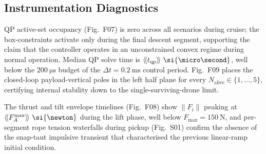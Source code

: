 \subsection{Instrumentation Diagnostics}
\label{sec:results:diag}
QP active-set occupancy (Fig.~F07) is zero across all scenarios during
cruise; the box-constraints activate only during the final descent
segment, supporting the claim that the controller operates in an
unconstrained convex regime during normal operation. Median QP solve
time is $\NEWQPsolve~\si{\micro\second}$, well below the $200~\si{\micro\second}$
budget of the $\Delta t = 0.2~\si{\milli\second}$ control period.
Fig.~F09 places the closed-loop payload-vertical poles in the left
half plane for every $N_{\mathrm{alive}}\in\{1,\dots,5\}$, certifying
internal stability down to the single-surviving-drone limit.

The thrust and tilt envelope timelines (Fig.~F08) show
$\lVert F_i\rVert$ peaking at $\NEWPeakFA~\si{\newton}$ during the
lift phase, well below $F_{\max}=\SI{150}{\newton}$, and per-segment
rope tension waterfalls during pickup (Fig.~S01) confirm the absence
of the snap-taut impulsive transient that characterised the previous
linear-ramp initial condition.
